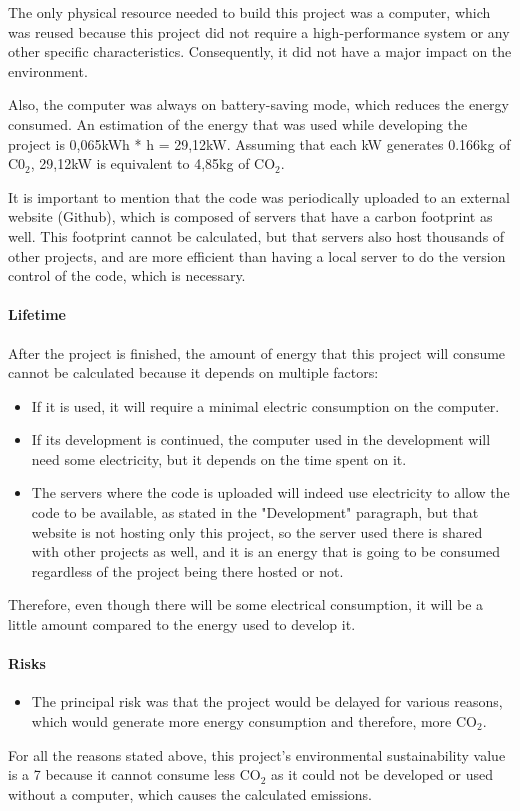 The only physical resource needed to build this project was a computer, which was reused because this project did not require a high-performance system or any other specific characteristics. Consequently, it did not have a major impact on the environment.

Also, the computer was always on battery-saving mode, which reduces the energy consumed. An estimation of the energy that was used while developing the project is 0,065kWh * \the\value{totalFinalHours} h = 29,12kW. Assuming that each kW generates 0.166kg of C0$_2$, 29,12kW is equivalent to 4,85kg of CO$_2$. 

It is important to mention that the code was periodically uploaded to an external website (Github), which is composed of servers that have a carbon footprint as well. This footprint cannot be calculated, but that servers also host thousands of other projects, and are more efficient than having a local server to do the version control of the code, which is necessary.

\paragraph{Lifetime}
After the project is finished, the amount of energy that this project will consume cannot be calculated because it depends on multiple factors:
\begin{itemize}
\item If it is used, it will require a minimal electric consumption on the computer.
\item If its development is continued, the computer used in the development will need some electricity, but it depends on the time spent on it.
\item The servers where the code is uploaded will indeed use electricity to allow the code to be available, as stated in the "Development" paragraph, but that website is not hosting only this project, so the server used there is shared with other projects as well, and it is an energy that is going to be consumed regardless of the project being there hosted or not. 
\end{itemize}

Therefore, even though there will be some electrical consumption, it will be a little amount compared to the energy used to develop it.

\paragraph{Risks}
\begin{itemize}
\item The principal risk was that the project would be delayed for various reasons, which would generate more energy consumption and therefore, more CO$_2$.
\end{itemize}

For all the reasons stated above, this project's environmental sustainability value is a 7 because it cannot consume less CO$_2$ as it could not be developed or used without a computer, which causes the calculated emissions. 
